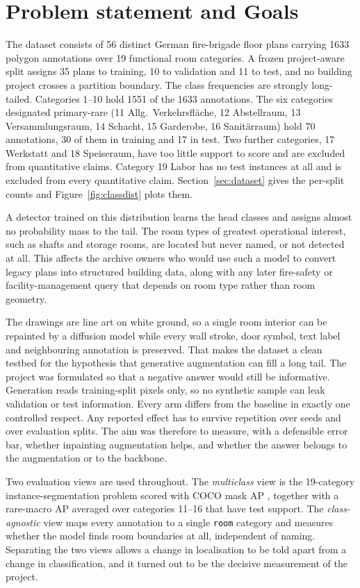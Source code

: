 \section{Problem statement and Goals}

The dataset consists of 56 distinct German fire-brigade floor plans carrying
1633 polygon annotations over 19 functional room categories. A frozen
project-aware split assigns 35 plans to training, 10 to validation and 11 to
test, and no building project crosses a partition boundary. The class
frequencies are strongly long-tailed. Categories 1--10 hold 1551 of the 1633
annotations. The six categories designated primary-rare (11 Allg.\
Verkehrsfl\"ache, 12 Abstellraum, 13 Versammlungsraum, 14 Schacht, 15 Garderobe,
16 Sanit\"arraum) hold 70 annotations, 30 of them in training and 17 in test.
Two further categories, 17 Werkstatt and 18 Speiseraum, have too little support to score and are excluded from quantitative claims. Category 19 Labor has no test instances at
all and is excluded from every quantitative claim. Section~\ref{sec:dataset}
gives the per-split counts and Figure~\ref{fig:classdist} plots them.

A detector trained on this distribution learns the head classes and assigns
almost no probability mass to the tail. The room types of greatest operational
interest, such as shafts and storage rooms, are located but never named, or not
detected at all. This affects the archive owners who would use such a model to
convert legacy plans into structured building data, along with any later
fire-safety or facility-management query that depends on room type rather than
room geometry.

The drawings are line art on white ground, so a single room interior can be
repainted by a diffusion model while every wall stroke, door symbol, text label
and neighbouring annotation is preserved. That makes the dataset a clean testbed
for the hypothesis that generative augmentation can fill a long tail. The
project was formulated so that a negative answer would still be informative.
Generation reads training-split pixels only, so no synthetic sample can leak
validation or test information. Every arm differs from the baseline in exactly
one controlled respect. Any reported effect has to survive repetition over seeds
and over evaluation splits. The aim was therefore to measure, with a defensible
error bar, whether inpainting augmentation helps, and whether the answer belongs
to the augmentation or to the backbone.

Two evaluation views are used throughout. The \emph{multiclass} view is the
19-category instance-segmentation problem scored with COCO mask AP
\cite{lin2014coco}, together with a rare-macro AP averaged over categories
11--16 that have test support. The \emph{class-agnostic} view maps every
annotation to a single \texttt{room} category and measures whether the model
finds room boundaries at all, independent of naming. Separating the two views
allows a change in localisation to be told apart from a change in
classification, and it turned out to be the decisive measurement of the project.

